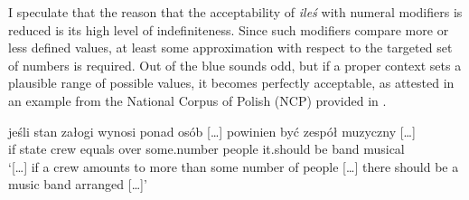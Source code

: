 \documentclass[output=paper,
]{langscibook}
\begin{document}
	\begin{multicols}{2}
		
		\ea \label{ex:degree-modifiers-iles}
	\columnbreak
	
		\z
        \z
		\end{multicols}
		
\begin{multicols}{2}		
		\ea \label{ex:numeral-modifiers-iles} \label{ex:numeral-modifiers-iles-ponad}
	\columnbreak
		\z
        \z

	\end{multicols}
	
	\noindent I speculate that the reason that the acceptability of \textit{ileś} with numeral modifiers is reduced is its high level of indefiniteness. Since such modifiers compare more or less defined values, at least some approximation with respect to the targeted set of numbers is required. Out of the blue  sounds odd, but if a proper context sets a plausible range of possible values, it becomes perfectly acceptable, as attested in an example from the National Corpus of Polish (NCP) provided in .
	
	\ea \gll [\dots] jeśli stan załogi wynosi ponad  osób [\dots] powinien być zespół muzyczny [\dots]\\
	{} if state crew equals over some.number people {} it.should be band musical\\
	\glt `[\dots] if a crew amounts to more than some number of people [\dots] there should be a music band arranged [\dots]'\label{ex:numeral-modifiers-iles-ncp}
    \z
	
\end{document}

